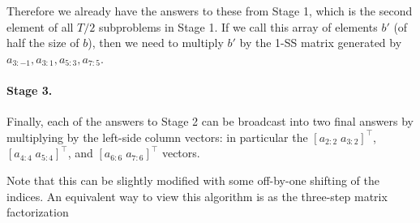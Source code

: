 Therefore we already have the answers to these from Stage 1,
which is the second element of all $T/2$ subproblems in Stage 1.
If we call this array of elements $b'$ (of half the size of $b$),
then we need to multiply $b'$ by the 1-SS matrix generated by $a_{3:-1}, a_{3:1}, a_{5:3}, a_{7:5}$.
%

\paragraph{Stage 3.}
Finally, each of the answers to Stage 2 can be broadcast into two final answers by multiplying by the left-side column vectors:
in particular the $[ a_{2:2} \; a_{3:2} ]^{\top}$, $[ a_{4:4} \; a_{5:4} ]^{\top}$, and $[ a_{6:6} \; a_{7:6} ]^{\top}$ vectors.

Note that this can be slightly modified with some off-by-one shifting of the indices.
An equivalent way to view this algorithm is as the three-step matrix factorization

